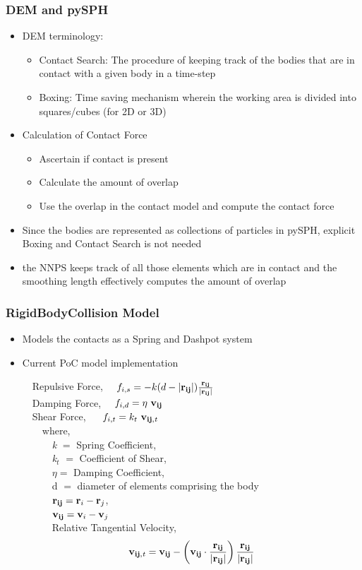 \documentclass{beamer}
\begin{document}
 \begin{frame} %
 \frametitle{DEM and pySPH}
 \begin{itemize}
  \item DEM terminology:
  \begin{itemize}
   \item Contact Search: The procedure of keeping track of the bodies that are in contact with a given body in a time-step
   \item Boxing: Time saving mechanism wherein the working area is divided into squares/cubes (for 2D or 3D)
  \end{itemize}\pause
  \item Calculation of Contact Force
  \begin{itemize}
   \item Ascertain if contact is present
   \item Calculate the amount of overlap
   \item Use the overlap in the contact model and compute the contact force
  \end{itemize}\pause
  \item Since the bodies are represented as collections of particles in pySPH, explicit Boxing and Contact Search is not needed
  \item the NNPS keeps track of all those elements which are in contact and the smoothing length effectively computes the amount of overlap  
 \end{itemize}
 \end{frame}
%
 \begin{frame} %
  \frametitle{RigidBodyCollision Model}
  \begin{itemize}
  \item Models the 	contacts as a Spring and Dashpot system \pause
  \item Current PoC model implementation
  
   ~~Repulsive Force, ~~$f_{i,s} = -k(d-|{\bf{r_{ij}}}|)\frac{{\bf{r_{ij}}}}{|{\bf{r_{ij}}}|}$ \\
    ~~Damping Force, ~~$f_{i,d} = \eta ~ {\bf{v_{ij}}}$ \\ 
    ~~Shear Force, ~~ $f_{i,t} = k_{t} ~ {\bf{v_{ij,{\it{t}}}}}$\\
    ~~~~where, \\
    ~~~~~~{\it{k}} $=$ Spring Coefficient, \\
    ~~~~~~{\it{k$_t$}} $=$ Coefficient of Shear, \\
    ~~~~~~$\eta =$ Damping Coefficient,\\
    ~~~~~~d $=$ diameter of elements comprising the body\\ 
    ~~~~~~${\bf{r_{ij}}} = \textbf{r}_{i} - \textbf{r}_{j}$,\\
    ~~~~~~${\bf{v_{ij}}} =\textbf{v}_{i} - \textbf{v}_{j} $ \\
    ~~~~~~Relative Tangential Velocity, $${\bf{v_{ij,{\it{t}}}}} = {\bf{v_{ij}}} - \left({\bf{v_{ij}}} \cdot \frac{{\bf{r_{ij}}}}{|{\bf{r_{ij}}}|}\right) \frac{{\bf{r_{ij}}}}{|{\bf{r_{ij}}}|} $$\\
  \end{itemize}
 \end{frame}
\end{document}
